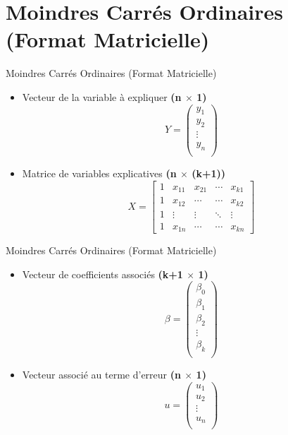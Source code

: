 \documentclass{beamer}
\begin{document}
\section{Moindres Carrés Ordinaires (Format Matricielle)}
\frame{\tableofcontents[current]}

\begin{frame}{Moindres Carrés Ordinaires (Format Matricielle)}
\begin{itemize}
  \item Vecteur de la variable à expliquer \textbf{(n $\times$ 1)}
  \[
    Y = \begin{pmatrix}
      y_1 \\ 
      y_2 \\ 
      \vdots \\
      y_n \\
    \end{pmatrix}
  \]
  \item Matrice de variables explicatives \textbf{(n $\times$ (k+1))}
  \[
    X = \begin{bmatrix}
      1 & x_{11} & x_{21} & \cdots & x_{k1} \\ 
      1 & x_{12} & \cdots & \cdots & x_{k2} \\ 
      1 & \vdots & \vdots & \ddots & \vdots \\ 
      1 & x_{1n} & \cdots & \cdots & x_{kn}
    \end{bmatrix}
  \]
\end{itemize}
\end{frame}

\begin{frame}{Moindres Carrés Ordinaires (Format Matricielle)}
\begin{itemize}
  \item Vecteur de coefficients associés \textbf{(k+1 $\times$ 1)}
  \[
    \beta = \begin{pmatrix}
      \beta_0 \\ 
      \beta_1 \\ 
      \beta_2 \\ 
      \vdots \\
      \beta_k \\
    \end{pmatrix}
  \]
  \item Vecteur associé au terme d'erreur \textbf{(n $\times$ 1)}
  \[
    u = \begin{pmatrix}
      u_1 \\ 
      u_2 \\ 
      \vdots \\
      u_n \\
    \end{pmatrix}
  \]
\end{itemize}
\end{frame}
\end{document}
